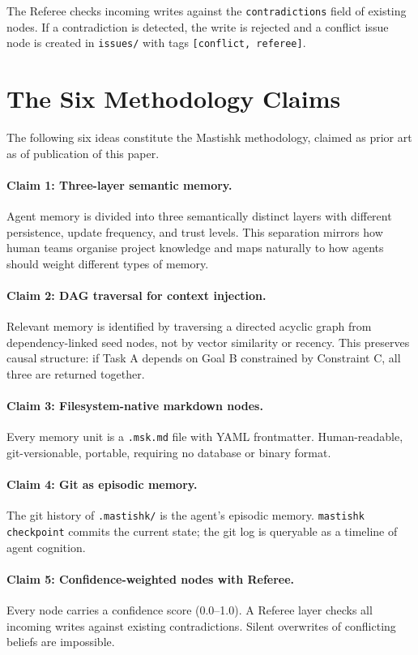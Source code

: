 \documentclass[11pt]{article}
\begin{document}
The Referee checks incoming writes against the \texttt{contradictions} field of existing nodes. If a contradiction is detected, the write is rejected and a conflict issue node is created in \texttt{issues/} with tags \texttt{[conflict, referee]}.

\section{The Six Methodology Claims}
\label{sec:claims}

The following six ideas constitute the Mastishk methodology, claimed as prior art as of publication of this paper.

\paragraph{Claim 1: Three-layer semantic memory.}
Agent memory is divided into three semantically distinct layers with different persistence, update frequency, and trust levels. This separation mirrors how human teams organise project knowledge and maps naturally to how agents should weight different types of memory.

\paragraph{Claim 2: DAG traversal for context injection.}
Relevant memory is identified by traversing a directed acyclic graph from dependency-linked seed nodes, not by vector similarity or recency. This preserves causal structure: if Task A depends on Goal B constrained by Constraint C, all three are returned together.

\paragraph{Claim 3: Filesystem-native markdown nodes.}
Every memory unit is a \texttt{.msk.md} file with YAML frontmatter. Human-readable, git-versionable, portable, requiring no database or binary format.

\paragraph{Claim 4: Git as episodic memory.}
The git history of \texttt{.mastishk/} is the agent's episodic memory. \texttt{mastishk checkpoint} commits the current state; the git log is queryable as a timeline of agent cognition.

\paragraph{Claim 5: Confidence-weighted nodes with Referee.}
Every node carries a confidence score (0.0--1.0). A Referee layer checks all incoming writes against existing contradictions. Silent overwrites of conflicting beliefs are impossible.
\end{document}
